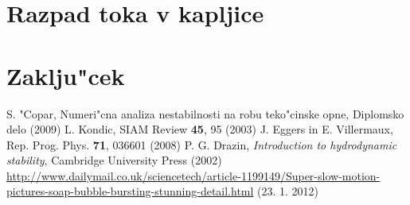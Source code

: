 \documentclass[a4paper,10pt]{article}
\begin{document}
\section{Razpad toka v kapljice}

\section{Zaklju"cek}

\begin{thebibliography}{3}
   S. "Copar, Numeri"cna analiza nestabilnosti na robu teko"cinske opne, Diplomsko delo (2009)
   L. Kondic, SIAM Review \textbf{45}, 95 (2003)
   J. Eggers in E. Villermaux, Rep. Prog. Phys. \textbf{71}, 036601 (2008)
   P. G. Drazin, \textit{Introduction to hydrodynamic stability}, Cambridge University Press (2002)
   \url{http://www.dailymail.co.uk/sciencetech/article-1199149/Super-slow-motion-pictures-soap-bubble-bursting-stunning-detail.html} (23. 1. 2012)
\end{thebibliography}
\end{document}
